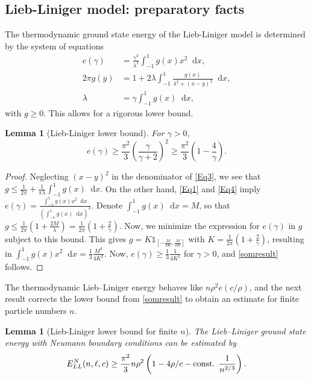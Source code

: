 \documentclass[a4paper,11pt]{article}
\newcommand*\diff{\mathop{}\!\mathrm{d}}
\newtheorem{lemma}[theorem]{Lemma}
\numberwithin{equation}{section}
\begin{document}
	\subsection{Lieb-Liniger model: preparatory facts}
	\label{secprep}
	The thermodynamic ground state energy of the Lieb-Liniger model is determined by the system of equations \cite{lieb1963exact}
	\begin{align}
		\label{Eq1}
		e(\gamma)&=\frac{\gamma^3}{\lambda^3}\int_{-1}^{1}g(x)x^2\diff x,\\
		2\pi g(y)&=1+2\lambda\int_{-1}^{1}\frac{g(x)}{\lambda^2+(x-y)^2}\diff x\label{Eq3},\\
		\lambda&=\gamma\int_{-1}^{1}g(x)\diff x,\label{Eq4}
	\end{align}
	with $g\geq0$. 
	This allows for a rigorous lower bound.
	\begin{lemma}[Lieb-Liniger lower bound] \label{LemmaLL-LowerBound}
		For $\gamma>0$,
		\begin{equation}
			\label{somresult}
			e(\gamma)\geq \frac{\pi^2}{3}\left(\frac{\gamma}{\gamma+2}\right)^2\geq \frac{\pi^2}{3}\left(1-\frac{4}{\gamma}\right).
		\end{equation}
	\end{lemma}
	\begin{proof}
		Neglecting $ (x-y)^2 $ in the denominator of \eqref{Eq3}, we see that $ g\leq \frac{1}{2\pi}+\frac{1}{\pi\lambda}\int_{-1}^{1}g(x)\diff x $. On the other hand, \eqref{Eq1} and \eqref{Eq4} imply $ e(\gamma)=\frac{\int_{-1}^{1}g(x)x^2\diff x}{\left(\int_{-1}^{1}g(x)\diff x\right)^3} $. Denote $ \int_{-1}^{1}g(x)\diff x=M $, so that $ g\leq \frac{1}{2\pi}\left(1+\frac{2M}{\lambda}\right)=\frac{1}{2\pi}\left(1+\frac{2}{\gamma}\right)$. Now, we minimize the expression for $e(\gamma)$ in $g$ subject to this bound. This gives $ g=K\mathds{1}_{[-\frac{M}{2K},\frac{M}{2K}]} $ with $ K=\frac{1}{2\pi}\left(1+\frac{2}{\gamma}\right) $, resulting in $ \int_{-1}^{1}g(x)x^2\diff x=\frac{1}{3}\frac{M^3}{4 K^2}$. Now, $e(\gamma)\geq \frac{1}{3}\frac{1}{4K^2}$ for $\gamma>0$, and \eqref{somresult} follows.
	\end{proof}
	The thermodynamic Lieb--Liniger energy behaves like $n\rho^2 e(c/\rho)$, and the next result corrects the lower bound from \eqref{somresult} to obtain an estimate for finite particle numbers $n$.
	\begin{lemma}[Lieb-Liniger lower bound for finite $n$]\label{LemmaLiebLinigerNeumannLowerBound}
		The Lieb--Liniger ground state energy with Neumann boundary conditions can be estimated by
		\begin{equation}
			E_{LL}^{N}(n,\ell,c)\geq \frac{\pi^2}{3}n\rho^2\left(1-4\rho/c-\textnormal{const. }\frac{1}{n^{2/3}}\right).
		\end{equation}
	\end{lemma}
\end{document}
